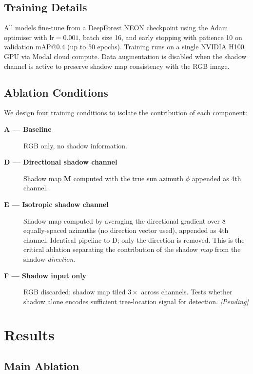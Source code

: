 \documentclass[10pt,twocolumn]{article}
\begin{document}
\subsection{Training Details}

All models fine-tune from a DeepForest NEON checkpoint using the Adam
optimiser with $\text{lr}=0.001$, batch size 16, and early stopping with
patience 10 on validation mAP@0.4 (up to 50 epochs). Training runs on a
single NVIDIA H100 GPU via Modal cloud compute. Data augmentation is disabled
when the shadow channel is active to preserve shadow map consistency with the
RGB image.

\subsection{Ablation Conditions}

We design four training conditions to isolate the contribution of each
component:

\begin{description}
  \item[\textbf{A --- Baseline}] RGB only, no shadow information.
  \item[\textbf{D --- Directional shadow channel}] Shadow map $\mathbf{M}$
        computed with the true sun azimuth $\phi$ appended as 4th channel.
  \item[\textbf{E --- Isotropic shadow channel}] Shadow map computed by
        averaging the directional gradient over 8 equally-spaced azimuths
        (no direction vector used), appended as 4th channel. Identical
        pipeline to D; only the direction is removed. This is the critical
        ablation separating the contribution of the shadow \emph{map} from
        the shadow \emph{direction}.
  \item[\textbf{F --- Shadow input only}] RGB discarded; shadow map tiled
        $3\times$ across channels. Tests whether shadow alone encodes
        sufficient tree-location signal for detection.
        \textit{[Pending]}
\end{description}

\section{Results}

\subsection{Main Ablation}
\end{document}
